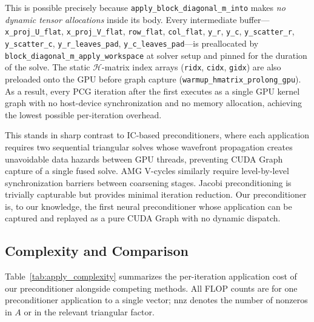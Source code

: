 \documentclass[acmtog,anonymous,review]{acmart}
\begin{document}
This is possible precisely because \texttt{apply\_block\_diagonal\_m\_into} makes \emph{no
dynamic tensor allocations} inside its body.  Every intermediate buffer---\texttt{x\_proj\_U\_flat},
\texttt{x\_proj\_V\_flat}, \texttt{row\_flat}, \texttt{col\_flat}, \texttt{y\_r}, \texttt{y\_c},
\texttt{y\_scatter\_r}, \texttt{y\_scatter\_c}, \texttt{y\_r\_leaves\_pad},
\texttt{y\_c\_leaves\_pad}---is preallocated by \texttt{block\_diagonal\_m\_apply\_workspace} at
solver setup and pinned for the duration of the solve.  The static $\mathcal{H}$-matrix index
arrays (\texttt{ridx}, \texttt{cidx}, \texttt{gidx}) are also preloaded onto the GPU before graph
capture (\texttt{warmup\_hmatrix\_prolong\_gpu}).  As a result, every PCG iteration after the
first executes as a single GPU kernel graph with no host-device synchronization and no memory
allocation, achieving the lowest possible per-iteration overhead.

This stands in sharp contrast to IC-based preconditioners, where each application requires two
sequential triangular solves whose wavefront propagation creates unavoidable data hazards between
GPU threads, preventing CUDA Graph capture of a single fused solve.  AMG V-cycles similarly
require level-by-level synchronization barriers between coarsening stages.  Jacobi preconditioning
is trivially capturable but provides minimal iteration reduction.  Our preconditioner is, to our
knowledge, the first neural preconditioner whose application can be captured and replayed as a
pure CUDA Graph with no dynamic dispatch.

\subsection{Complexity and Comparison}
\label{sec:application:complexity}

Table~\ref{tab:apply_complexity} summarizes the per-iteration application cost of our preconditioner
alongside competing methods.  All FLOP counts are for one preconditioner application to a single
vector; $\mathrm{nnz}$ denotes the number of nonzeros in $A$ or in the relevant triangular factor.
\end{document}
